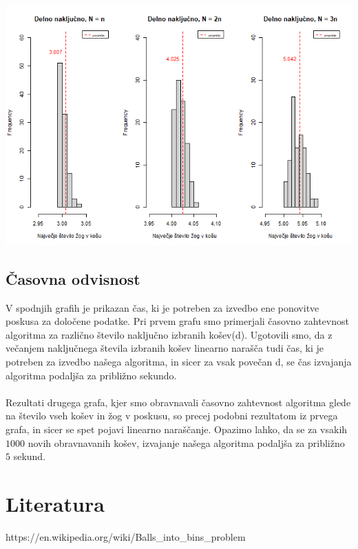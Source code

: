 \documentclass[a4paper, 11pt]{article}
\begin{document}
\includegraphics[scale=0.60]{delno_nakljucno2.png}

\subsection{Časovna odvisnost}

V spodnjih grafih je prikazan čas, ki je potreben za izvedbo ene ponovitve poskusa za določene podatke. Pri prvem grafu smo primerjali časovno zahtevnost algoritma za različno število naključno izbranih košev(d). Ugotovili smo, da z večanjem naključnega števila izbranih košev linearno narašča tudi čas, ki je potreben za izvedbo našega algoritma, in sicer za vsak povečan d, se čas izvajanja algoritma podaljša za približno sekundo.
\\
\\
Rezultati drugega grafa, kjer smo obravnavali časovno zahtevnost algoritma glede na število vseh košev in žog v poskusu, so precej podobni rezultatom iz prvega grafa, in sicer se spet pojavi linearno naraščanje. Opazimo lahko, da se za vsakih $1000$ novih obravnavanih košev, izvajanje našega algoritma podaljša za približno $5$ sekund. 

\pagebreak
\section*{Literatura}

https://en.wikipedia.org/wiki/Balls\_into\_bins\_problem
\end{document}
